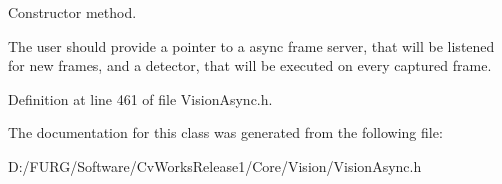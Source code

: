 Constructor method. 

The user should provide a pointer to a async frame server, that will be listened for new frames, and a detector, that will be executed on every captured frame. 

Definition at line 461 of file Vision\+Async.\+h.



The documentation for this class was generated from the following file\+:\begin{DoxyCompactItemize}
\item 
D\+:/\+F\+U\+R\+G/\+Software/\+Cv\+Works\+Release1/\+Core/\+Vision/Vision\+Async.\+h\end{DoxyCompactItemize}
